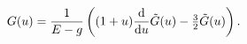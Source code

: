 \begin{equation}
\label{G(1)nonsing}
G(u) = \frac{1}{E-g} \left(
(1+u) \frac{{\rm d}}{{\rm d} u} {\tilde G}(u) 
-\tfrac{3}{2} {\tilde G}(u)
\right).
\end{equation}

